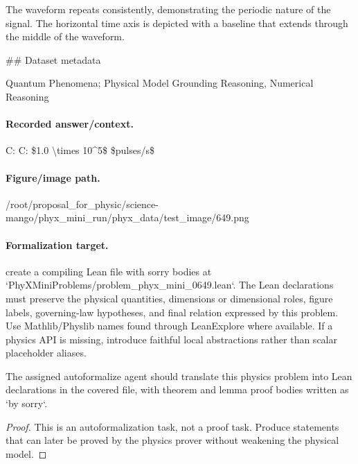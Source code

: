 The waveform repeats consistently, demonstrating the periodic nature of the signal. The horizontal time axis is depicted with a baseline that extends through the middle of the waveform.

\#\# Dataset metadata

Quantum Phenomena; Physical Model Grounding Reasoning, Numerical Reasoning

\paragraph{Recorded answer/context.}
C: C: \$1.0 \textbackslash{}times 10\textasciicircum{}5\$ \$pulses/s\$

\paragraph{Figure/image path.}
/root/proposal\_for\_physic/science-mango/phyx\_mini\_run/phyx\_data/test\_image/649.png

\paragraph{Formalization target.}
create a compiling Lean file with sorry bodies at `PhyXMiniProblems/problem\_phyx\_mini\_0649.lean`. The Lean declarations must preserve the physical quantities, dimensions or dimensional roles, figure labels, governing-law hypotheses, and final relation expressed by this problem.
Use Mathlib/Physlib names found through LeanExplore where available. If a physics API is missing, introduce faithful local abstractions rather than scalar placeholder aliases.

\begin{theorem}
\label{thm:physics:phyx_mini_0649:target}
The assigned autoformalize agent should translate this physics problem into Lean declarations in the covered file, with theorem and lemma proof bodies written as `by sorry`.
\end{theorem}
\begin{proof}
This is an autoformalization task, not a proof task. Produce statements that can later be proved by the physics prover without weakening the physical model.
\end{proof}

